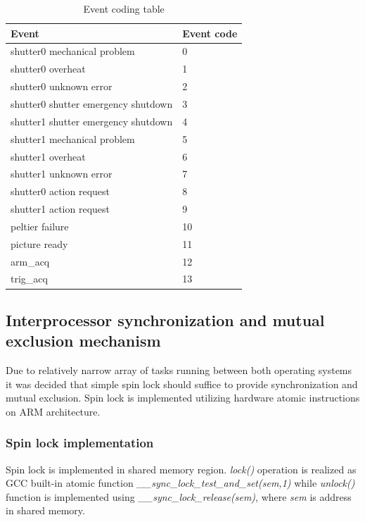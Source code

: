 \begin{table}[H]
\begin{center}
    \begin{tabular}{ | l || l  |}
    \hline
    Event 			& Event code 	\\ \hline
	shutter0 mechanical problem			& 0 	\\ \hline
	shutter0 overheat					& 1 	\\ \hline
	shutter0 unknown error				& 2 	\\ \hline
	shutter0 shutter emergency shutdown & 3 	\\ \hline
	shutter1 shutter emergency shutdown & 4 	\\ \hline
	shutter1 mechanical problem			& 5 	\\ \hline
	shutter1 overheat					& 6 	\\ \hline
	shutter1 unknown error				& 7 	\\ \hline
	shutter0 action request				& 8 	\\ \hline
	shutter1 action request				& 9 	\\ \hline
	peltier failure						& 10 	\\ \hline
	picture ready						& 11 	\\ \hline
	arm\_acq				& 12 	\\ \hline
	trig\_acq 			& 13 	\\ \hline
	
    \end{tabular}
    \end{center}
    \caption{Event coding table}
	\label{table:event_enc_table}
\end{table}

\subsection{Interprocessor synchronization and mutual exclusion mechanism}
Due to relatively narrow array of tasks running between both operating systems it was decided that simple spin lock should suffice to provide synchronization and mutual exclusion. Spin lock is implemented utilizing hardware atomic instructions on ARM architecture.

\subsubsection{Spin lock implementation}
Spin lock is implemented in shared memory region. \emph{lock()} operation is realized as GCC built-in atomic function \emph{\_\_sync\_lock\_test\_and\_set(sem,1)} while \emph{unlock()} function is implemented using \emph{\_\_sync\_lock\_release(sem)}, where \emph{sem} is address in shared memory.


